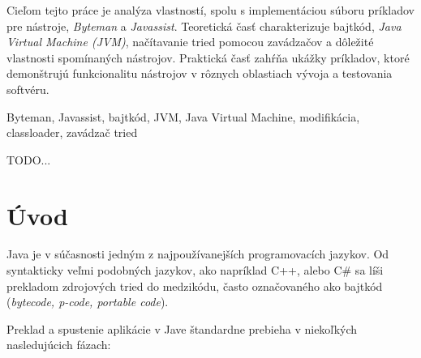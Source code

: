 \documentclass[11pt,final,oneside]{fithesis}
\begin{document}
\FrontMatter
\ThesisTitlePage

\begin{ThesisDeclaration}
\DeclarationText
\AdvisorName
\end{ThesisDeclaration}

\begin{ThesisAbstract}
Cieľom tejto práce je analýza vlastností, spolu s implementáciou súboru
príkladov pre nástroje, \textit{Byteman} a \textit{Javassist}. Teoretická časť 
charakterizuje bajtkód, \textit{Java Virtual Machine (JVM)}, načítavanie tried
pomocou zavádzačov a dôležité vlastnosti spomínaných nástrojov. Praktická časť 
zahŕňa ukážky príkladov, ktoré demonštrujú funkcionalitu nástrojov v rôznych oblastiach 
vývoja a testovania softvéru.
\end{ThesisAbstract}

\begin{ThesisKeyWords}
Byteman, Javassist, bajtkód, JVM, Java Virtual Machine, modifikácia, 
classloader, zavádzač tried
\end{ThesisKeyWords}

\begin{ThesisThanks}
TODO...
\end{ThesisThanks}

\MainMatter
\tableofcontents

\chapter{Úvod}

Java je v súčasnosti jedným z najpoužívanejších programovacích jazykov.
Od syntakticky veľmi podobných jazykov, ako napríklad C++, alebo
C\# sa líši prekladom zdrojových tried do medzikódu, často označovaného ako
bajtkód (\textit{bytecode, p-code, portable code}).

Preklad a spustenie aplikácie v Jave štandardne prebieha v niekoľkých
nasledujúcich fázach:
\end{document}
